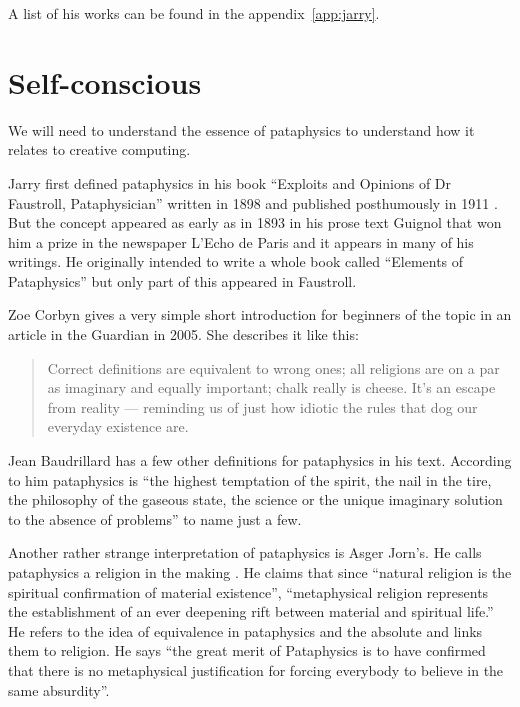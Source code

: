 A list of his works can be found in the appendix~\ref{app:jarry}.


\section{Self-conscious}

We will need to understand the essence of pataphysics to understand how it relates to creative computing.

Jarry first defined pataphysics in his book ``Exploits and Opinions of Dr Faustroll, Pataphysician'' written in 1898 and published posthumously in 1911 \citep{Jarry1996}. But the concept appeared as early as in 1893 in his prose text Guignol that won him a prize in the newspaper L'Echo de Paris and it appears in many of his writings. He originally intended to write a whole book called ``Elements of Pataphysics'' but only part of this appeared in Faustroll.

Zoe Corbyn gives a very simple short introduction for beginners of the topic in an article in the Guardian \citep{Corbyn2005} in 2005. She describes it like this:

\begin{quote}
  Correct definitions are equivalent to wrong ones; all religions are on a par as imaginary and equally important; chalk really is cheese. It's an escape from reality --- reminding us of just how idiotic the rules that dog our everyday existence are. \citep{Jarry1996}
\end{quote}

Jean Baudrillard has a few other definitions for pataphysics in his text\citep{Baudrillard2007}. According to him pataphysics is ``the highest temptation of the spirit, the nail in the tire, the philosophy of the gaseous state, the science or the unique imaginary solution to the absence of problems'' to name just a few.

Another rather strange interpretation of pataphysics is Asger Jorn's. He calls pataphysics a religion in the making \citep{Jorn1961}. He claims that since ``natural religion is the spiritual confirmation of material existence'', ``metaphysical religion represents the establishment of an ever deepening rift between material and spiritual life.'' He refers to the idea of equivalence in pataphysics and the absolute and links them to religion. He says ``the great merit of Pataphysics is to have confirmed that there is no metaphysical justification for forcing everybody to believe in the same absurdity''.


